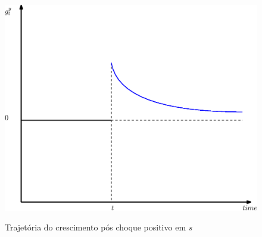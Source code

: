 \documentclass[11pt,a4paper]{article}
\begin{document}
\begin{figure}[!h]
\centering
\caption{Trajetória do crescimento pós choque positivo em $s$} \vspace{2ex}
\includegraphics[scale=.5]{solow08.eps}
\label{fig:convergencia5}
\end{figure} 

 
\end{document}
